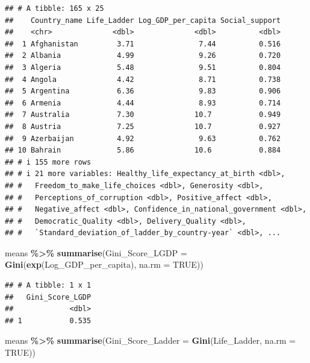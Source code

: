 \documentclass[
]{article}
\newenvironment{Shaded}{\begin{snugshade}}{\end{snugshade}}
\newcommand{\AttributeTok}[1]{\textcolor[rgb]{0.13,0.29,0.53}{#1}}
\newcommand{\ConstantTok}[1]{\textcolor[rgb]{0.56,0.35,0.01}{#1}}
\newcommand{\FunctionTok}[1]{\textcolor[rgb]{0.13,0.29,0.53}{\textbf{#1}}}
\newcommand{\NormalTok}[1]{#1}
\newcommand{\SpecialCharTok}[1]{\textcolor[rgb]{0.81,0.36,0.00}{\textbf{#1}}}
\begin{document}
\begin{verbatim}
## # A tibble: 165 x 25
##    Country_name Life_Ladder Log_GDP_per_capita Social_support
##    <chr>              <dbl>              <dbl>          <dbl>
##  1 Afghanistan         3.71               7.44          0.516
##  2 Albania             4.99               9.26          0.720
##  3 Algeria             5.48               9.51          0.804
##  4 Angola              4.42               8.71          0.738
##  5 Argentina           6.36               9.83          0.906
##  6 Armenia             4.44               8.93          0.714
##  7 Australia           7.30              10.7           0.949
##  8 Austria             7.25              10.7           0.927
##  9 Azerbaijan          4.92               9.63          0.762
## 10 Bahrain             5.86              10.6           0.884
## # i 155 more rows
## # i 21 more variables: Healthy_life_expectancy_at_birth <dbl>,
## #   Freedom_to_make_life_choices <dbl>, Generosity <dbl>,
## #   Perceptions_of_corruption <dbl>, Positive_affect <dbl>,
## #   Negative_affect <dbl>, Confidence_in_national_government <dbl>,
## #   Democratic_Quality <dbl>, Delivery_Quality <dbl>,
## #   `Standard_deviation_of_ladder_by_country-year` <dbl>, ...
\end{verbatim}

\begin{Shaded}
\begin{Highlighting}[]
\NormalTok{means }\SpecialCharTok{\%\textgreater{}\%} \FunctionTok{summarise}\NormalTok{(}\AttributeTok{Gini\_Score\_LGDP =} \FunctionTok{Gini}\NormalTok{(}\FunctionTok{exp}\NormalTok{(Log\_GDP\_per\_capita), }\AttributeTok{na.rm =} \ConstantTok{TRUE}\NormalTok{))}
\end{Highlighting}
\end{Shaded}

\begin{verbatim}
## # A tibble: 1 x 1
##   Gini_Score_LGDP
##             <dbl>
## 1           0.535
\end{verbatim}

\begin{Shaded}
\begin{Highlighting}[]
\NormalTok{means }\SpecialCharTok{\%\textgreater{}\%} \FunctionTok{summarise}\NormalTok{(}\AttributeTok{Gini\_Score\_Ladder =} \FunctionTok{Gini}\NormalTok{(Life\_Ladder, }\AttributeTok{na.rm =} \ConstantTok{TRUE}\NormalTok{))}
\end{Highlighting}
\end{Shaded}
\end{document}
